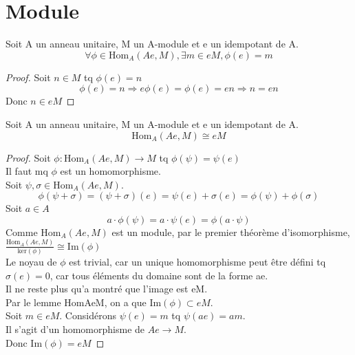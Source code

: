 \chapter{Module}

\begin{lemma}[HomAeM]
    \label{HomAeM}
    Soit A un anneau unitaire, M un A-module et e un idempotant de A.
    \[ \forall \phi \in \text{Hom}_{A}(Ae,M), \exists m \in e M, \phi(e)=m\]
\end{lemma}
\begin{proof}
    Soit $ n \in M$ tq $\phi(e)=n$
    \[ \phi(e) = n \Rightarrow e \phi(e) = \phi(e) = e n \Rightarrow n = e n \]
    Donc $ n \in e M$
\end{proof}

\begin{lemma}[HomAeMisoeM]
    \label{HomAeMisoeM}
    Soit A un anneau unitaire, M un A-module et e un idempotant de A.
    \[ \text{Hom}_{A}(A e,M) \cong e M\]
\end{lemma}
\begin{proof}
    Soit $\phi : \text{Hom}_{A}(A e,M) \to M$ tq $\phi(\psi) = \psi(e)$\\
    Il faut mq $\phi$ est un homomorphisme.\\
    Soit $\psi , \sigma \in \text{Hom}_{A}(A e,M)$.\\
    \[ \phi(\psi + \sigma) = (\psi + \sigma)(e) = \psi(e) + \sigma(e) = \phi(\psi) + \phi(\sigma) \]
    Soit $a \in A$
    \[ a \cdot \phi(\psi) = a \cdot \psi(e) = \phi(a \cdot \psi) \]
    Comme $\text{Hom}_{A}(A e,M)$ est un module, par le premier théorème d'isomorphisme, \\
    $\frac{\text{Hom}_{A}(A e,M)}{\text{ker}(\phi)} \cong \text{Im}(\phi)$\\
    Le noyau de $\phi$ est trivial, car un unique homomorphisme peut être défini tq $\sigma(e) = 0$, car tous éléments du domaine sont de la forme ae.\\
    Il ne reste plus qu'a montré que l'image est eM.\\
    Par le lemme HomAeM, on a que $\text{Im}(\phi) \subset e M$.\\
    Soit $m \in e M$. Considérons $\psi(e)=m$ tq $\psi(ae) = am$.\\
    Il s'agit d'un homomorphisme de $A e \to M$.\\
    Donc $\text{Im}(\phi) = e M$
\end{proof}